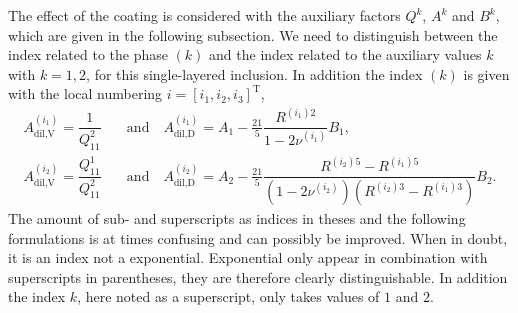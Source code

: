 The effect of the coating is considered with the auxiliary factors $Q^k$, $A^k$ and $B^k$, which are given in the following subsection.
We need to distinguish between the index related to the phase ${(k)}$ and the index related to the auxiliary values $k$ with $k = 1,2$, for this single-layered inclusion.
In addition the index $(k)$ is given with the local numbering $i = [i_1,i_2,i_3]^{\text{T}}$,
\begin{align}
	A^{(i_1)}_{\text{dil,V}} = \dfrac{1}{Q^{2}_{11} } \quad &\text{and} \quad
	A^{(i_1)}_{\text{dil,D}} = A_1 - \frac{21}{5}\dfrac{R^{(i_1)2}}{1-2\nu^{(i_1)}}B_1, \\
	A^{(i_2)}_{\text{dil,V}} = \dfrac{Q^{1}_{11} }{Q^{2}_{11}}\quad &\text{and} \quad
	A^{(i_2)}_{\text{dil,D}} = A_2 - \frac{21}{5}\dfrac{R^{(i_2)5}-R^{(i_1)5}}{(1-2\nu^{(i_2)})(R^{(i_2)3}-R^{(i_1)3})}B_2.
\end{align}
The amount of sub- and superscripts as indices in theses and the following formulations is at times confusing and can possibly be improved.
When in doubt, it is an index not a exponential.
Exponential only appear in combination with superscripts in parentheses, they are therefore clearly distinguishable.
In addition the index $k$, here noted as a superscript, only takes values of $1$ and $2$.
